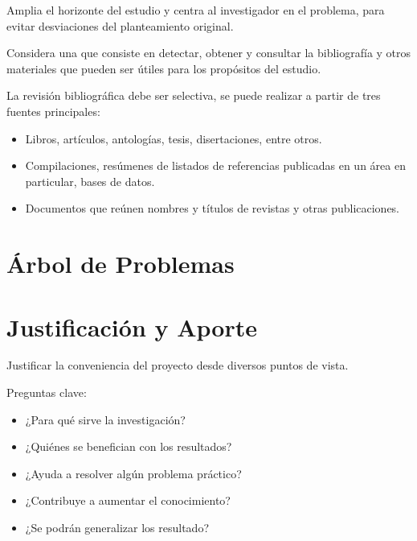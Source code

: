 \documentclass[letter,12pt]{report}
\begin{document}
 Amplia el horizonte del estudio y centra al investigador en el problema, para evitar desviaciones del planteamiento original.

Considera una  que consiste en detectar, obtener y consultar la bibliografía y otros materiales que pueden ser útiles para los propósitos del estudio.

La revisión bibliográfica debe ser selectiva, se puede realizar a partir de tres fuentes principales:

\begin{itemize}\justifying
  \item {} Libros, artículos, antologías, tesis, disertaciones, entre otros.
  \item {} Compilaciones, resúmenes de listados de referencias publicadas en un área en particular, bases de datos.
  \item {} Documentos que reúnen nombres y títulos de revistas y otras publicaciones.
\end{itemize}


\begin{ejemplo}
\lipsum[1]%
\end{ejemplo} 


\section{Árbol de Problemas}
\lipsum[1]%

\section{Justificación y Aporte}
Justificar la conveniencia del proyecto desde diversos puntos de vista.

Preguntas clave:
  \begin{itemize}
  \item ¿Para qué sirve la investigación?
  \item ¿Quiénes se benefician con los resultados?
  \item ¿Ayuda a resolver algún problema práctico?
  \item ¿Contribuye a aumentar el conocimiento?
  \item ¿Se podrán generalizar los resultado?
\end{itemize}


\begin{ejemplo}
\lipsum[1]%
\end{ejemplo}
\end{document}
